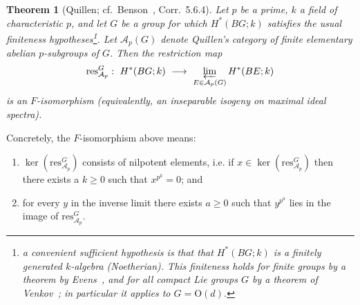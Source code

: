 \documentclass[aps,prx,reprint,superscriptaddress,twocolumn,amsmath,amssymb,amsfonts, nofootinbib]{revtex4-2}
\newcommand{\res}{\text{res}}
\theoremstyle{apsstyle}
\newtheorem{theorem}{Theorem}[section]
\begin{document}
\bigskip 

\begin{theorem}[Quillen; cf.~Benson~\cite{Benson_Ch5}, Corr.~5.6.4]
\label{theorem:quillen}
Let $p$ be a prime, $k$ a field of characteristic $p$, and let $G$ be a group for which $H^*(BG;k)$ satisfies the usual finiteness hypotheses\footnote{a convenient sufficient hypothesis is that that $H^*(BG;k)$ is a finitely generated $k$-algebra (Noetherian). This finiteness holds for finite groups by a theorem by Evens~\cite{Evens1961}, and for all compact Lie groups $G$ by a theorem of Venkov~\cite{Venkov1959}; in particular it applies to $G=\mathrm{O}(d)$.}.
Let $\mathcal A_p(G)$ denote Quillen's category of finite elementary abelian $p$-subgroups of $G$.
Then the restriction map
\begin{equation}
  \res_{\mathcal A_{p}}^{G}:\ H^*(BG;k)\ \longrightarrow\
  \varprojlim_{E\in \mathcal A_p(G)} H^*(BE;k)
\end{equation}
is an \emph{$F$-isomorphism} (equivalently, an inseparable isogeny on maximal ideal spectra). 
\end{theorem}

\bigskip 

\noindent Concretely, the $F$-isomorphism above means:
\begin{enumerate}
\item $\ker(\res^{G}_{\mathcal{A}_{p}})$ consists of nilpotent elements, i.e. if $x\in \ker(\res^{G}_{\mathcal{A}_{p}})$ then there exists a $k\geq 0$ such that $x^{p^k}=0$; and
\item for every $y$ in the inverse limit there exists $a\ge 0$ such that $y^{p^{a}}$ lies in the image of $\res^{G}_{\mathcal{A}_{p}}$.
\end{enumerate}

\bigskip 
\end{document}
